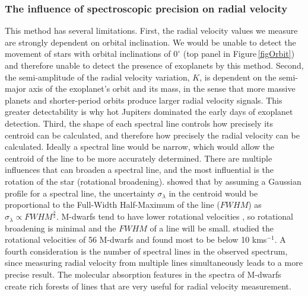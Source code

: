 \subsubsection{The influence of spectroscopic precision on radial velocity}
\label{secRVPrecision}
This method has several limitations. First, the radial velocity values we measure are strongly dependent on orbital inclination. We would be unable to detect the movement of stars with orbital inclinations of $0^{\circ}$ (top panel in Figure\,\ref{figOrbit}) and therefore unable to detect the presence of exoplanets by this method. Second, the semi-amplitude of the radial velocity variation, $K$, is dependent on the semi-major axis of the exoplanet's orbit and its mass, in the sense that more massive planets and shorter-period orbits produce larger radial velocity signals. This greater detectability is why hot Jupiters dominated the early days of exoplanet detection. Third, the shape of each spectral line controls how precisely its centroid can be calculated, and therefore how precisely the radial velocity can be calculated. Ideally a spectral line would be narrow, which would allow the centroid of the line to be more accurately determined. There are multiple influences that can broaden a spectral line, and the most influential is the rotation of the star (rotational broadening). \citet{2010Lovis} showed that by assuming a Gaussian profile for a spectral line, the uncertainty $\sigma_{\lambda}$ in the centroid would be proportional to the Full-Width Half-Maximum of the line ($FWHM$) as $\sigma_\lambda \propto FWHM^{\frac{3}{2}}$. M-dwarfs tend to have lower rotational velocities \citep{2005Reid}, so rotational broadening is minimal and the $FWHM$ of a line will be small. \citet{2009Jenkins} studied the rotational velocities of 56 M-dwarfs and found most to be below 10 kms$^{-1}$. A fourth consideration is the number of spectral lines in the observed spectrum, since measuring radial velocity from multiple lines simultaneously leads to a more precise result. The molecular absorption features in the spectra of M-dwarfs create rich forests of lines that are very useful for radial velocity measurement.\\

